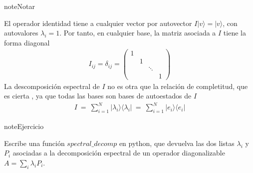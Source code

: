 \documentclass[letterpaper,10pt,english]{jupyterBook}
\newcommand{\ket}[1]{|#1\rangle}
\newcommand{\ketbra}[2]{| #1\rangle \langle #2 |}
\begin{document}
\begin{sphinxadmonition}{note}{Notar}

\sphinxAtStartPar
El operador identidad tiene a cualquier vector por autovector \( I\ket{v} = \ket{v}\), con autovalores \(\lambda_ i = 1\). Por tanto, en cualquier base, la matriz asociada a \(I\) tiene la forma diagonal
\begin{equation*}
\begin{split}
I_{ij} = \delta_{ij} = \begin{pmatrix} 1 &  &  &  \\ & 1 & &  \\ & & \ddots & \\ & & &  1 \end{pmatrix}
\end{split}
\end{equation*}
\sphinxAtStartPar
La descomposición espectral de \(I\) no es otra que la relación de completitud, que es cierta , ya que todas las bases son bases de autoestados de \(I\)
\begin{equation*}
\begin{split}
I ~=~ \sum_{i=1}^N \ketbra{\lambda_i}{\lambda_i} ~=~ \sum_{i=1}^N \ketbra{e_i}{e_i}
\end{split}
\end{equation*}\end{sphinxadmonition}

\begin{sphinxadmonition}{note}{Ejercicio}

\sphinxAtStartPar
Escribe una función  \(spectral\_decomp\) en python, que devuelva las dos listas \(\lambda_i\) y \(P_i\) asociadas a la decomposición espectral de un operador diagonalizable \(A = \sum_i \lambda_i P_i\).
\end{sphinxadmonition}
\end{document}
